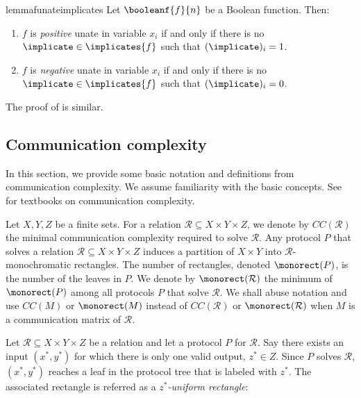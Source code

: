\documentclass[acmsmall, nonacm, authorversion]{acmart}
\begin{document}
\begin{restatable}{lemma}{funateimplicates}\label{lem:f-unate-implicates}
Let $\booleanf{f}{n}$ be a Boolean function. Then:
\begin{enumerate}
    \item $f$ is \emph{positive} unate in variable $x_{i}$ if and only if there is no $\implicate \in \implicates{f}$ such that $(\implicate)_{i}=1$. \label{item:f-unate-implicates-1}
    \item $f$ is \emph{negative} unate in variable $x_{i}$ if and only if there is no $\implicate \in \implicates{f}$ such that $(\implicate)_{i}=0$.\label{item:f-unate-implicates-2}
\end{enumerate}    
\end{restatable}

The proof of  is similar.

\subsection{Communication complexity}\label{section:communication-complexity}
In this section, we provide some basic notation and definitions from communication complexity. We assume familiarity with the basic concepts.
See \cite{KN97,RY20} for textbooks on communication complexity. 

Let $X,Y,Z$ be a finite sets. For a relation $\mathcal{R} \subseteq X \times Y \times Z$, we denote by $CC(\mathcal{R})$ the minimal communication complexity required to solve $\mathcal{R}$. 
Any protocol $P$ that solves a relation $\mathcal{R} \subseteq X \times Y \times Z$ induces a partition of $X \times Y$ into $\mathcal{R}$-monochromatic rectangles. The number of rectangles, denoted $\monorect(P)$, is the number of the leaves in $P$. We denote by $\monorect({\mathcal{R}})$ the minimum of $\monorect({P})$ among all protocols $P$ that solve $\mathcal{R}$. 
We shall abuse notation and use $CC(M)$ or $\monorect(M)$ instead of $CC({\mathcal{R}})$ or $\monorect({\mathcal{R}})$ when $M$ is a communication matrix of $\mathcal{R}$.

Let $\mathcal{R} \subseteq X \times Y \times Z$ be a relation and let a protocol $P$ for $\mathcal{R}$. Say there exists an input $(x^*, y^*)$ for which there is only one valid output, $z^* \in Z$. Since $P$ solves $\mathcal{R}$,  $(x^*,y^*)$ reaches a leaf in the protocol tree that is labeled with $z^*$. The associated rectangle is referred as a \emph{$z^*$-uniform rectangle}:
\end{document}
